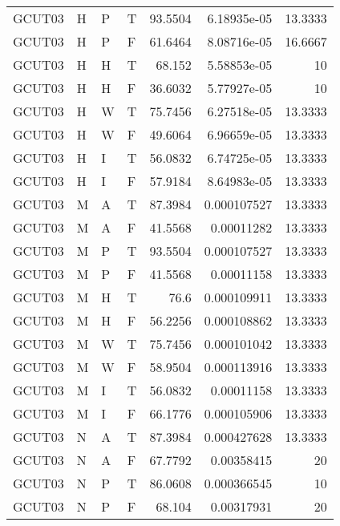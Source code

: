 \begin{longtable}{llllrrr}
    GCUT03   & H     & P     & T          & 93.5504    & 6.18935e-05 & 13.3333  \\
    GCUT03   & H     & P     & F          & 61.6464    & 8.08716e-05 & 16.6667  \\
    GCUT03   & H     & H     & T          & 68.152     & 5.58853e-05 & 10       \\
    GCUT03   & H     & H     & F          & 36.6032    & 5.77927e-05 & 10       \\
    GCUT03   & H     & W     & T          & 75.7456    & 6.27518e-05 & 13.3333  \\
    GCUT03   & H     & W     & F          & 49.6064    & 6.96659e-05 & 13.3333  \\
    GCUT03   & H     & I     & T          & 56.0832    & 6.74725e-05 & 13.3333  \\
    GCUT03   & H     & I     & F          & 57.9184    & 8.64983e-05 & 13.3333  \\
    GCUT03   & M     & A     & T          & 87.3984    & 0.000107527 & 13.3333  \\
    GCUT03   & M     & A     & F          & 41.5568    & 0.00011282  & 13.3333  \\
    GCUT03   & M     & P     & T          & 93.5504    & 0.000107527 & 13.3333  \\
    GCUT03   & M     & P     & F          & 41.5568    & 0.00011158  & 13.3333  \\
    GCUT03   & M     & H     & T          & 76.6       & 0.000109911 & 13.3333  \\
    GCUT03   & M     & H     & F          & 56.2256    & 0.000108862 & 13.3333  \\
    GCUT03   & M     & W     & T          & 75.7456    & 0.000101042 & 13.3333  \\
    GCUT03   & M     & W     & F          & 58.9504    & 0.000113916 & 13.3333  \\
    GCUT03   & M     & I     & T          & 56.0832    & 0.00011158  & 13.3333  \\
    GCUT03   & M     & I     & F          & 66.1776    & 0.000105906 & 13.3333  \\
    GCUT03   & N     & A     & T          & 87.3984    & 0.000427628 & 13.3333  \\
    GCUT03   & N     & A     & F          & 67.7792    & 0.00358415  & 20       \\
    GCUT03   & N     & P     & T          & 86.0608    & 0.000366545 & 10       \\
    GCUT03   & N     & P     & F          & 68.104     & 0.00317931  & 20       \\

\end{longtable}
